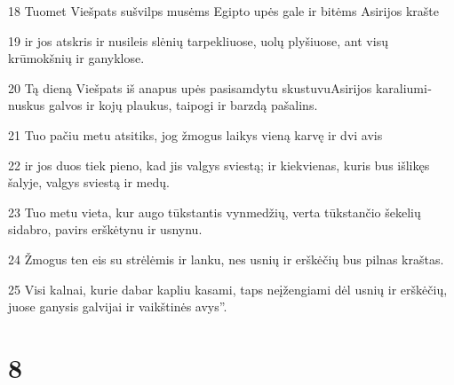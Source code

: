 \par 18 Tuomet Viešpats sušvilps musėms Egipto upės gale ir bitėms Asirijos krašte 
\par 19 ir jos atskris ir nusileis slėnių tarpekliuose, uolų plyšiuose, ant visų krūmokšnių ir ganyklose. 
\par 20 Tą dieną Viešpats iš anapus upės pasisamdytu skustuvu­Asirijos karaliumi­nuskus galvos ir kojų plaukus, taipogi ir barzdą pašalins. 
\par 21 Tuo pačiu metu atsitiks, jog žmogus laikys vieną karvę ir dvi avis 
\par 22 ir jos duos tiek pieno, kad jis valgys sviestą; ir kiekvienas, kuris bus išlikęs šalyje, valgys sviestą ir medų. 
\par 23 Tuo metu vieta, kur augo tūkstantis vynmedžių, verta tūkstančio šekelių sidabro, pavirs erškėtynu ir usnynu. 
\par 24 Žmogus ten eis su strėlėmis ir lanku, nes usnių ir erškėčių bus pilnas kraštas. 
\par 25 Visi kalnai, kurie dabar kapliu kasami, taps neįžengiami dėl usnių ir erškėčių, juose ganysis galvijai ir vaikštinės avys”.



\chapter{8}


